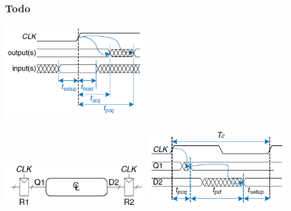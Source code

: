 \documentclass{beamer}
\begin{document}
\begin{frame}
\frametitle{Todo}
\includegraphics[width=0.45\textwidth]{fig/timing_clk.png}

\includegraphics[width=0.45\textwidth]{fig/timing_clk3.png}
\hfill 
\includegraphics[width=0.45\textwidth]{fig/timing_clk2.png}

\end{frame}
\end{document}
